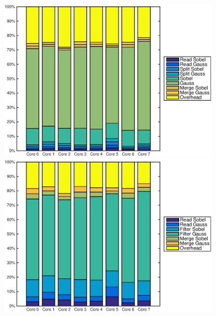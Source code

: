 \begin{figure}
    \centering
    \begin{minipage}{0.45\textwidth}
        \centering
        \includegraphics[width=0.99\linewidth]{images/openem_cifcif_6initial_func.eps}
    \end{minipage}
    \hfill
    \begin{minipage}{0.45\textwidth}
        \centering
        \includegraphics[width=0.99\linewidth]{images/openem_cifcif_6initial_eo.eps}
    \end{minipage}%
\end{figure}

